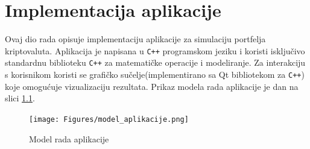 \documentclass[zavrsnirad, upload]{fer}
\begin{document}
\chapter{Implementacija aplikacije}
\label{pog:implementacija}
Ovaj dio rada opisuje implementaciju aplikacije za simulaciju
portfelja kriptovaluta. Aplikacija je napisana u \texttt{C++} programskom
jeziku i koristi isključivo standardnu biblioteku \texttt{C++} za matematičke
operacije i modeliranje. Za interakciju s korisnikom koristi se
grafičko sučelje(implementirano sa Qt bibliotekom za \texttt{C++}) koje
omogućuje vizualizaciju rezultata. Prikaz modela rada aplikacije
je dan na slici \ref{fig:model_aplikacije}.
\\

\begin{figure}[H]
    \centering
    \texttt{[image: Figures/model\_aplikacije.png]}
    \caption{Model rada aplikacije}
    \label{fig:model_aplikacije}
\end{figure}
\end{document}
